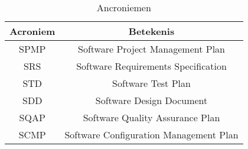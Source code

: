 \begin{table}[h]
\centering
\begin{tabular}{c|c}
\textbf{Acroniem} & \textbf{Betekenis} \\
\hline
SPMP & Software Project Management Plan  \\
SRS & Software Requirements Specification \\
STD & Software Test Plan \\
SDD & Software Design Document \\
SQAP & Software Quality Assurance Plan \\
SCMP & Software Configuration Management Plan 
\end{tabular}
\caption{Ancroniemen}
\label{tab:my_label}
\end{table}